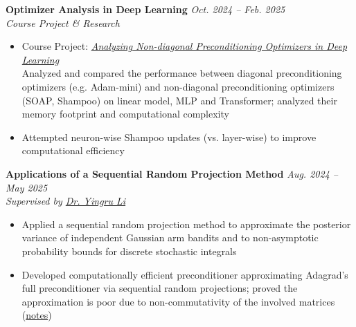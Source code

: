 \documentclass[10pt]{extarticle}
\begin{document}
\textbf{Optimizer Analysis in Deep Learning} \hfill \textit{Oct. 2024 -- Feb. 2025}\\
\textit{Course Project \& Research}
\begin{itemize}[leftmargin=1em, label=$\bullet$, nosep, topsep=0pt]
  \item Course Project: \textit{\textcolor{black}{\href{https://bingran-li.github.io/blog/Course\%20Project\%20(DDA6202\%20Optimization\%20in\%20Machine\%20Learning).html\#course-project-dda6202-optimization-in-machine-learning}{Analyzing Non-diagonal Preconditioning Optimizers in Deep Learning}}}\\
  Analyzed and compared the performance between diagonal preconditioning optimizers (e.g. Adam-mini) and non-diagonal preconditioning optimizers (SOAP, Shampoo) on linear model, MLP and Transformer; analyzed their memory footprint and computational complexity
  \item Attempted neuron-wise Shampoo updates (vs. layer-wise) to improve computational efficiency
\end{itemize}

\textbf{Applications of a Sequential Random Projection Method} \hfill \textit{Aug. 2024 -- May 2025}\\
\textit{Supervised by \href{https://richardli.xyz/}{Dr. Yingru Li}}
\begin{itemize}[leftmargin=1em, label=$\bullet$, nosep, topsep=0pt]
  \item Applied a sequential random projection method to approximate the posterior variance of independent Gaussian arm bandits and to non-asymptotic probability bounds for discrete stochastic integrals
  \item Developed computationally efficient preconditioner approximating Adagrad's full preconditioner via sequential random projections; proved the approximation is poor due to non-commutativity of the involved matrices (\href{https://bingran-li.github.io/blog/notes/Incremental%20Approximation%20of%20Covariance%20Square%20Root.html}{notes})
\end{itemize}
\end{document}

